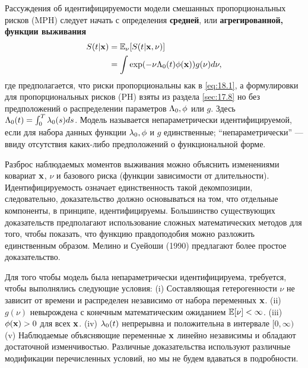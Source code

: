 Рассуждения об идентифицируемости модели смешанных пропорциональных рисков (MPH) следует начать с определения \textbf{средней}, или \textbf{агрегированной, функции выживания}
    \begin{align}
        \label{eq:18.17}
        S(t|\mathbf{x}) &= \mathbb{E}_\nu[S(t|\mathbf{x},\nu)] \\
                &= \int\exp(-\nu\Lambda_0(t)\phi(\mathbf{x})) g(\nu)d\nu, \notag
    \end{align}
где предполагается, что риски пропорциональны как в \ref{eq:18.1}, а формулировки для пропорциональных рисков (PH) взяты из раздела \ref{sec:17.8} 
но без предположений о распределении параметров $\Lambda_0, \phi$ или $g$. Здесь $\Lambda_0(t) = \int^{T}_{0}\lambda_0(s)ds$. Модель называется непараметрически идентифицируемой, если для набора данных функции $\lambda_0, \phi$ и $g$ единственные; ``непараметрически'' --- ввиду отсутствия каких-либо предположений о функциональной форме.

Разброс наблюдаемых моментов выживания можно объяснить изменениями ковариат $\mathbf{x}$, $\nu$ и базового риска (функции зависимости от длительности). Идентифицируемость означает единственность такой декомпозиции, следовательно, доказательство должно основываться на том, что отдельные компоненты, в принципе, идентифицируемы. Большинство существующих доказательств предполагают использование сложных математических методов для того, чтобы показать, что функцию правдоподобия можно разложить единственным образом. Мелино и Суейоши (1990) предлагают более простое доказательство.

Для того чтобы модель была непараметрически идентифицируема, требуется, чтобы выполнялись следующие условия:
(i) Составляющая гетерогенности $\nu$ не зависит от времени и распределен независимо от набора переменных $\mathbf{x}$.
(ii) $g(\nu)$ невырождена с конечным математическим ожиданием $\mathbb{E}[\nu] < \infty$.
(iii) $\phi(\mathbf{x}) > 0$ для всех $\mathbf{x}$.
(iv) $\lambda_0(t)$ непрерывна и положительна в интервале $[0, \infty)$
(v) Наблюдаемые объясняющие переменные $\mathbf{x}$ линейно независимы и обладают достаточной изменчивостью.
Различные доказательства используют различные модификации перечисленных условий, но мы не будем вдаваться в подробности.

